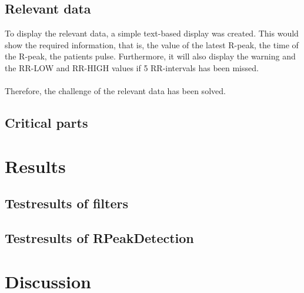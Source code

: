 \documentclass[12pt,a4paper]{article}
\begin{document}
\subsection{Relevant data}
	To display the relevant data, a simple text-based display was created. This would show the required information, that is, the value of the latest R-peak, the time of the R-peak, the patients pulse. Furthermore, it will also display the warning and the RR-LOW and RR-HIGH values if 5 RR-intervals has been missed.\\
	\\
	Therefore, the challenge of the relevant data has been solved.
\subsection{Critical parts}

\begin{figure}[h!]
\end{figure}

\section{Results}
\subsection{Testresults of filters}

\begin{figure}[h!]
\end{figure}
\subsection{Testresults of RPeakDetection}

\section{Discussion}
\end{document}
